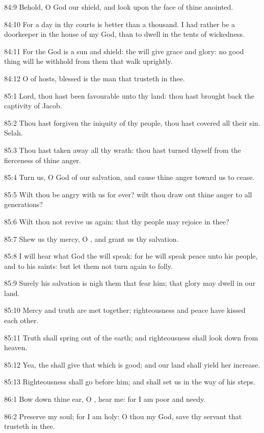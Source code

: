 84:9 Behold, O God our shield, and look upon the face of thine anointed.

84:10 For a day in thy courts is better than a thousand. I had rather be a doorkeeper in the house of my God, than to dwell in the tents of wickedness.

84:11 For the \LORD God is a sun and shield: the \LORD will give grace and glory: no good thing will he withhold from them that walk uprightly.

84:12 O \LORD of hosts, blessed is the man that trusteth in thee.



85:1 Lord, thou hast been favourable unto thy land: thou hast brought back the captivity of Jacob.

85:2 Thou hast forgiven the iniquity of thy people, thou hast covered all their sin. Selah.

85:3 Thou hast taken away all thy wrath: thou hast turned thyself from the fierceness of thine anger.

85:4 Turn us, O God of our salvation, and cause thine anger toward us to cease.

85:5 Wilt thou be angry with us for ever? wilt thou draw out thine anger to all generations?

85:6 Wilt thou not revive us again: that thy people may rejoice in thee?

85:7 Shew us thy mercy, O \LORD, and grant us thy salvation.

85:8 I will hear what God the \LORD will speak: for he will speak peace unto his people, and to his saints: but let them not turn again to folly.

85:9 Surely his salvation is nigh them that fear him; that glory may dwell in our land.

85:10 Mercy and truth are met together; righteousness and peace have kissed each other.

85:11 Truth shall spring out of the earth; and righteousness shall look down from heaven.

85:12 Yea, the \LORD shall give that which is good; and our land shall yield her increase.

85:13 Righteousness shall go before him; and shall set us in the way of his steps.



86:1 Bow down thine ear, O \LORD, hear me: for I am poor and needy.

86:2 Preserve my soul; for I am holy: O thou my God, save thy servant that trusteth in thee.

